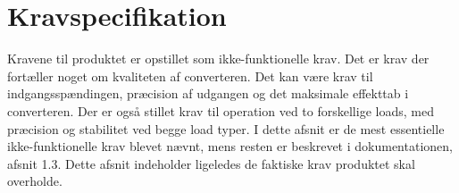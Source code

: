 \section{Kravspecifikation}
Kravene til produktet er opstillet som ikke-funktionelle krav. Det er krav der fortæller noget om kvaliteten af converteren. Det kan være krav til indgangsspændingen, præcision af udgangen og det maksimale effekttab i converteren. Der er også stillet krav til operation ved to forskellige loads, med præcision og stabilitet ved begge load typer. I dette afsnit er de mest essentielle ikke-funktionelle krav blevet nævnt, mens resten er beskrevet i dokumentationen, afsnit 1.3. Dette afsnit indeholder ligeledes de faktiske krav produktet skal overholde.

